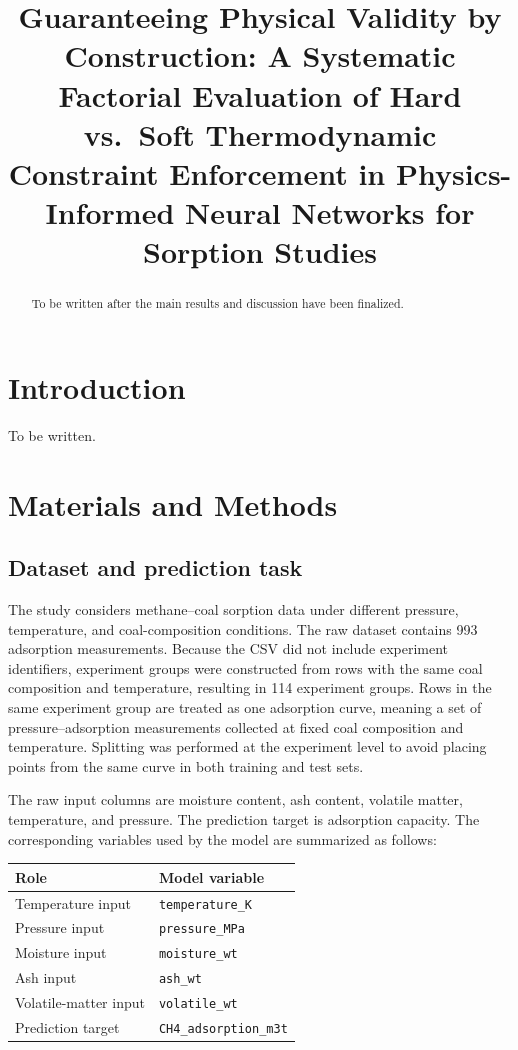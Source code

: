 \documentclass[11pt]{article}
\title{Guaranteeing Physical Validity by Construction: A Systematic
Factorial Evaluation of Hard vs.\ Soft Thermodynamic Constraint
Enforcement in Physics-Informed Neural Networks for Sorption Studies}
\author{}
\date{}
\begin{document}
\maketitle

\begin{abstract}
    To be written after the main results and discussion have been finalized.
\end{abstract}

\section{Introduction}

To be written.

\section{Materials and Methods}

\subsection{Dataset and prediction task}

The study considers methane--coal sorption data under different pressure,
temperature, and coal-composition conditions. The raw dataset contains
993 adsorption measurements. Because the CSV did not include experiment
identifiers, experiment groups were constructed from rows with the same coal
composition and temperature, resulting in 114 experiment groups. Rows in the
same experiment group are treated as one adsorption curve, meaning a set of
pressure--adsorption measurements collected at fixed coal composition and
temperature. Splitting was performed at the experiment level to avoid placing
points from the same curve in both training and test sets.

The raw input columns are moisture content, ash content, volatile matter,
temperature, and pressure. The prediction target is adsorption capacity. The
corresponding variables used by the model are summarized as follows:
\begin{center}
    \begin{tabular}{ll}
        \toprule
        \textbf{Role}         & \textbf{Model variable}       \\
        \midrule
        Temperature input     & \texttt{temperature\_K}       \\
        Pressure input        & \texttt{pressure\_MPa}        \\
        Moisture input        & \texttt{moisture\_wt}         \\
        Ash input             & \texttt{ash\_wt}              \\
        Volatile-matter input & \texttt{volatile\_wt}         \\
        Prediction target     & \texttt{CH4\_adsorption\_m3t} \\
        \bottomrule
    \end{tabular}
\end{center}
\end{document}
